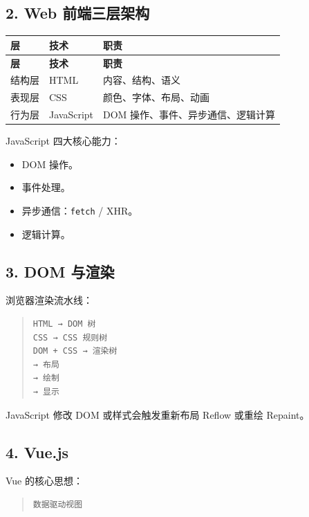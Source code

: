 \documentclass[UTF8,zihao=-4]{ctexart}
\begin{document}
\subsection{2. Web 前端三层架构}

{
\footnotesize
\begin{longtable}{|>{\raggedright\arraybackslash}p{}|>{\raggedright\arraybackslash}p{}|>{\raggedright\arraybackslash}p{}|}
\hline
\textbf{层} & \textbf{技术} & \textbf{职责} \\
\hline
\endfirsthead
\hline
\textbf{层} & \textbf{技术} & \textbf{职责} \\
\hline
\endhead
结构层 & HTML & 内容、结构、语义 \\
\hline
表现层 & CSS & 颜色、字体、布局、动画 \\
\hline
行为层 & JavaScript & DOM 操作、事件、异步通信、逻辑计算 \\
\hline
\end{longtable}
}


JavaScript 四大核心能力：

\begin{itemize}
\item DOM 操作。
\item 事件处理。
\item 异步通信：\texttt{fetch} / XHR。
\item 逻辑计算。
\end{itemize}

\subsection{3. DOM 与渲染}

浏览器渲染流水线：

\begin{quote}
\footnotesize
\begin{verbatim}
HTML → DOM 树
CSS → CSS 规则树
DOM + CSS → 渲染树
→ 布局
→ 绘制
→ 显示
\end{verbatim}
\end{quote}

JavaScript 修改 DOM 或样式会触发重新布局 Reflow 或重绘 Repaint。

\subsection{4. Vue.js}

Vue 的核心思想：

\begin{quote}
\footnotesize
\begin{verbatim}
数据驱动视图
\end{verbatim}
\end{quote}
\end{document}
